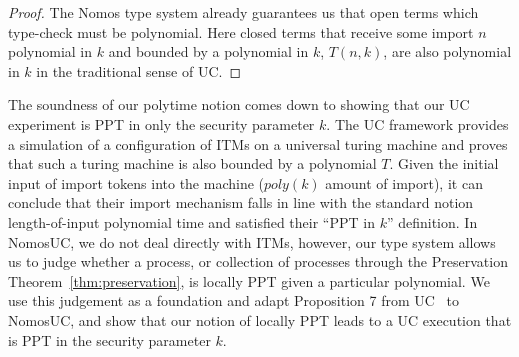 \begin{proof}
The Nomos type system already guarantees us that open terms which type-check must be polynomial. 
Here closed terms that receive some import $n$ polynomial in $k$ and bounded by a polynomial in $k$, $T(n,k)$, are also polynomial in $k$ in the traditional sense of UC.
\end{proof}


The soundness of our polytime notion comes down to showing that our UC experiment is PPT in only the security parameter $k$. 
The UC framework provides a simulation of a configuration of ITMs on a universal turing machine and proves that such a turing machine is also bounded by a polynomial $T$. 
Given the initial input of import tokens into the machine ($poly(k)$ amount of import), it can conclude that their import mechanism falls in line with the standard notion length-of-input polynomial time and satisfied their ``PPT in $k$'' definition. 
In NomosUC, we do not deal directly with ITMs, however, our type system allows us to judge whether a process, or collection of processes through the Preservation Theorem~\ref{thm:preservation}, is locally PPT given a particular polynomial. 
We use this judgement as a foundation and adapt Proposition 7 from UC~\cite{uc} to NomosUC, and show that our notion of locally PPT leads to a UC execution that is PPT in the security parameter $k$.

